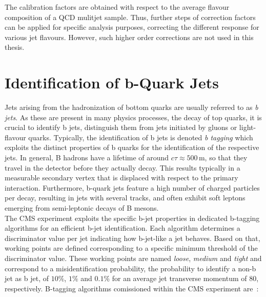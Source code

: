 The calibration factors are obtained with respect to the average flavour composition of a QCD mulitjet sample. Thus, further steps of correction factors can be applied for specific analysis purposes, \eg correcting the different response for various jet flavours. However, such higher order corrections are not used in this thesis.  

\section{Identification of b-Quark Jets}
\label{sec:btagging}
Jets arising from the hadronization of bottom quarks are usually referred to as \textit{b jets}. As these are present in many physics processes, \eg the decay of top quarks, it is crucial to identify b jets, \ie distinguish them from jets initiated by gluons or light-flavour quarks. Typically, the identification of b jets is denoted \textit{b tagging} which exploits the distinct properties of b quarks for the identification of the respective jets. In general, B hadrons have a lifetime of around $c\tau \approx 500$\,\textmu m, so that they travel in the detector before they actually decay. This results typically in a measurable secondary vertex that is displaced with respect to the primary interaction. Furthermore, b-quark jets feature a high number of charged particles per decay, resulting in jets with several tracks, and often exhibit soft leptons emerging from semi-leptonic decays of B mesons. \\
The CMS experiment exploits the specific b-jet properties in dedicated b-tagging algorithms for an efficient b-jet identification. Each algorithm determines a discriminator value per jet indicating how b-jet-like a jet behaves. Based on that, working points are defined corresponding to a specific minimum threshold of the discriminator value. These working points are named \textit{loose}, \textit{medium} and \textit{tight} and correspond to a misidentification probability, \ie the probability to identify a non-b jet as b jet, of $10\%$, $1\%$ and $0.1\%$ for an average jet transverse momentum of $80$\gev, respectively. B-tagging algorithms comissioned within the CMS experiment are~\cite{Chatrchyan:2012jua}:
